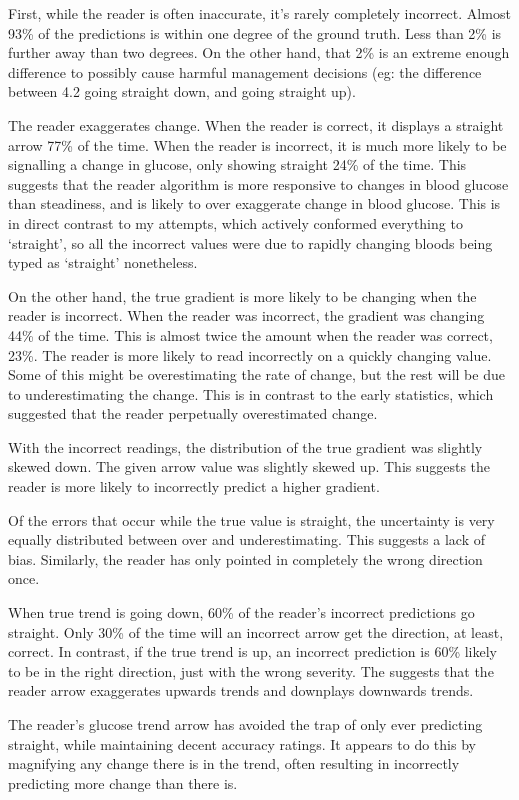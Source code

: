 First, while the reader is often inaccurate, it’s rarely completely incorrect. Almost 93\% of the predictions is within one degree of the ground truth. Less than 2\% is further away than two degrees. On the other hand, that 2\% is an extreme enough difference to possibly cause harmful management decisions (eg: the difference between 4.2 going straight down, and going straight up). 

The reader exaggerates change. When the reader is correct, it displays a straight arrow 77\% of the time. When the reader is incorrect, it is much more likely to be signalling a change in glucose, only showing straight 24\% of the time. This suggests that the reader algorithm is more responsive to changes in blood glucose than steadiness, and is likely to over exaggerate change in blood glucose. This is in direct contrast to my attempts, which actively conformed everything to ‘straight’, so all the incorrect values were due to rapidly changing bloods being typed as ‘straight’ nonetheless.

On the other hand, the true gradient is more likely to be changing when the reader is incorrect. When the reader was incorrect, the gradient was changing 44\% of the time. This is almost twice the amount when the reader was correct, 23\%. The reader is more likely to read incorrectly on a quickly changing value. Some of this might be overestimating the rate of change, but the rest will be due to underestimating the change. This is in contrast to the early statistics, which suggested that the reader perpetually overestimated change.

With the incorrect readings, the distribution of the true gradient was slightly skewed down. The given arrow value was slightly skewed up. This suggests the reader is more likely to incorrectly predict a higher gradient.

Of the errors that occur while the true value is straight, the uncertainty is very equally distributed between over and underestimating. This suggests a lack of bias. Similarly, the reader has only pointed in completely the wrong direction once. 

When true trend is going down, 60\% of the reader’s incorrect predictions go straight. Only 30\% of the time will an incorrect arrow get the direction, at least, correct. In contrast, if the true trend is up, an incorrect prediction is 60\% likely to be in the right direction, just with the wrong severity. The suggests that the reader arrow exaggerates upwards trends and downplays downwards trends.

The reader’s glucose trend arrow has avoided the trap of only ever predicting straight, while maintaining decent accuracy ratings. It appears to do this by magnifying any change there is in the trend, often resulting in incorrectly predicting more change than there is.


